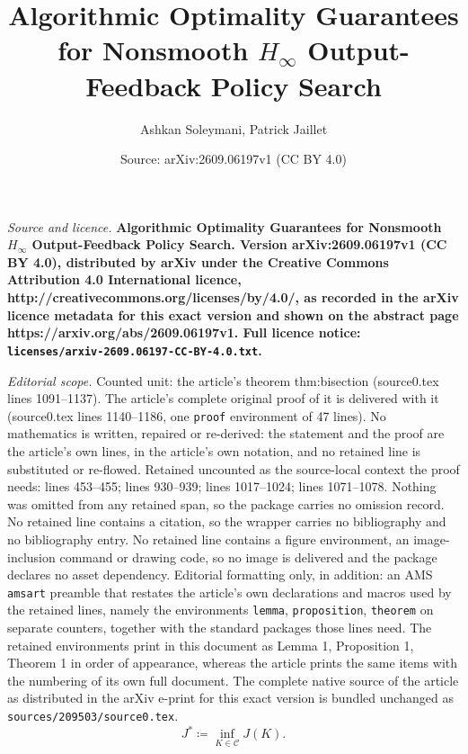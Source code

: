 \documentclass[10pt,a4paper]{amsart}
\title{\LARGE\bf Algorithmic Optimality Guarantees for Nonsmooth $H_\infty$ Output-Feedback Policy Search}
\author{Ashkan Soleymani, Patrick Jaillet}
\date{Source: arXiv:2609.06197v1 (CC BY 4.0)}
\providecommand{\cC}{\mathcal{C}}
\newcommand{\defeq}{\coloneqq}
\begin{document}
\maketitle

\noindent\emph{Source and licence.} \LARGE\bf Algorithmic Optimality Guarantees for Nonsmooth $H_\infty$ Output-Feedback Policy Search. Version arXiv:2609.06197v1 (CC BY 4.0), distributed by arXiv under the Creative Commons Attribution 4.0 International licence, http://creativecommons.org/licenses/by/4.0/, as recorded in the arXiv licence metadata for this exact version and shown on the abstract page https://arxiv.org/abs/2609.06197v1. Full licence notice: \texttt{licenses/arxiv-2609.06197-CC-BY-4.0.txt}.\par\smallskip

\noindent\textit{Editorial scope.} Counted unit: the article's theorem thm:bisection (source0.tex lines 1091--1137). The article's complete original proof of it is delivered with it (source0.tex lines 1140--1186, one \texttt{proof} environment of 47 lines). No mathematics is written, repaired or re-derived: the statement and the proof are the article's own lines, in the article's own notation, and no retained line is substituted or re-flowed.  Retained uncounted as the source-local context the proof needs: lines 453--455; lines 930--939; lines 1017--1024; lines 1071--1078.  Nothing was omitted from any retained span, so the package carries no omission record.  No retained line contains a citation, so the wrapper carries no bibliography and no bibliography entry.  No retained line contains a figure environment, an image-inclusion command or drawing code, so no image is delivered and the package declares no asset dependency.  Editorial formatting only, in addition: an AMS \texttt{amsart} preamble that restates the article's own declarations and macros used by the retained lines, namely the environments \texttt{lemma}, \texttt{proposition}, \texttt{theorem} on separate counters, together with the standard packages those lines need.  The retained environments print in this document as Lemma 1, Proposition 1, Theorem 1 in order of appearance, whereas the article prints the same items with the numbering of its own full document.  The complete native source of the article as distributed in the arXiv e-print for this exact version is bundled unchanged as \texttt{sources/209503/source0.tex}.
\begin{equation}\label{eq:policyopt}
J^* \defeq \inf_{K\in\cC} J(K).
\end{equation}
\end{document}
